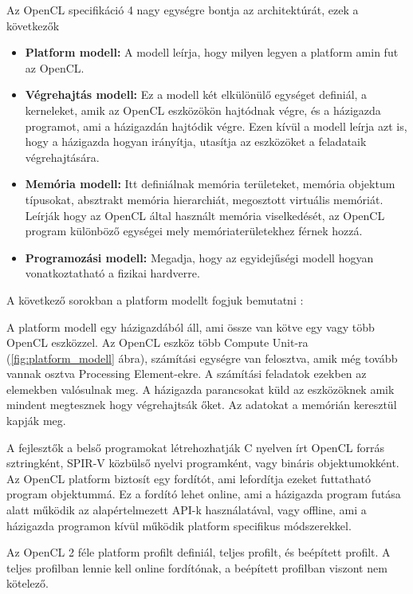 Az OpenCL specifikáció 4 nagy egységre bontja az architektúrát, ezek a következők \cite{spec_archi}
\begin{itemize}
\item \textbf{Platform modell:} A modell leírja, hogy milyen legyen a platform amin fut az OpenCL. 
\item \textbf{Végrehajtás modell:} Ez a modell két elkülönülő egységet definiál, a kerneleket, amik az OpenCL eszközökön hajtódnak végre, és a házigazda programot, ami a házigazdán hajtódik végre. Ezen kívül a modell leírja azt is, hogy a házigazda hogyan irányítja, utasítja az eszközöket a feladataik végrehajtására.
\item \textbf{Memória modell:} Itt definiálnak memória területeket,  memória objektum típusokat, absztrakt memória hierarchiát, megosztott virtuális memóriát. Leírják hogy az OpenCL által használt memória viselkedését, az OpenCL program különböző egységei mely memóriaterületekhez férnek hozzá.
\item \textbf{Programozási modell:} Megadja, hogy az egyidejűségi modell hogyan vonatkoztatható a fizikai hardverre.

\end{itemize}

A következő sorokban a platform modellt fogjuk bemutatni \cite{spec_platform} :

A platform modell egy házigazdából áll, ami össze van kötve egy vagy több OpenCL eszközzel. Az OpenCL eszköz több Compute Unit-ra (\ref{fig:platform_modell} ábra), számítási egységre van felosztva, amik még tovább vannak osztva Processing Element-ekre. A számítási feladatok ezekben az elemekben valósulnak meg. A házigazda parancsokat küld az eszközöknek amik mindent megtesznek hogy végrehajtsák őket. Az adatokat a memórián keresztül kapják meg. 

A fejlesztők a belső programokat létrehozhatják C nyelven írt OpenCL forrás sztringként, SPIR-V közbülső nyelvi programként, vagy bináris objektumokként. Az OpenCL platform biztosít egy fordítót, ami lefordítja ezeket futtatható program objektummá. Ez a fordító lehet online, ami a házigazda program futása alatt működik az alapértelmezett API-k használatával, vagy offline, ami a házigazda programon kívül működik platform specifikus módszerekkel.

Az OpenCL 2 féle platform profilt definiál, teljes profilt, és beépített profilt. A teljes profilban lennie kell online fordítónak, a beépített profilban viszont nem kötelező.

